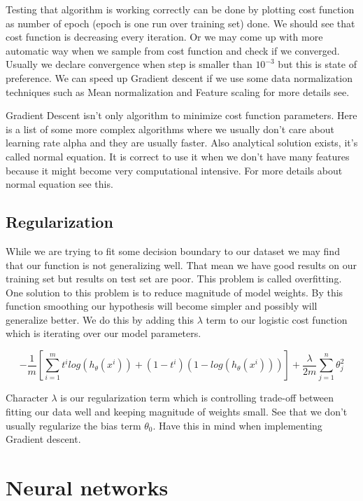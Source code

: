 Testing that algorithm is working correctly can be done by plotting cost function  as number of epoch (epoch is one run over training set) done. We should see that cost function is decreasing every iteration. Or we may come up with more automatic way when we sample from cost function and check if we converged. Usually we declare convergence when step is smaller than \(10^{-3}\) but this is state of preference.  We can speed up Gradient descent if we use some data normalization techniques such as Mean normalization and Feature scaling for more details see. 

Gradient Descent isn't only algorithm to minimize cost function parameters. Here is a list of some more complex algorithms where we usually don't care about learning rate alpha and they are usually faster. Also analytical solution exists, it's called normal equation. It is correct to use it when we don't have many features because it might become very computational intensive. For more details about normal equation see this.

\section{Regularization}
While we are trying to fit some decision boundary to our dataset we may find that our function is not generalizing well. That mean we have good results on our training set but results on test set are poor. This problem is called overfitting. One solution to this problem is to reduce magnitude of model weights. By this function smoothing our hypothesis will become simpler and possibly will generalize better. We do this by adding this \(\lambda\) term to our logistic cost function which is iterating over our model parameters.

\begin{equation}
-\frac{1}{m}[\sum\limits_{i=1}^m t^i log(h_\theta(x^i)) + (1-t^i) (1 - log(h_\theta(x^i)))] + \frac{\lambda}{2m}\sum\limits_{j=1}^n \theta_j^2 
\end{equation}

Character \(\lambda\) is our regularization term which is controlling trade-off between fitting our data well and keeping magnitude of weights small. See that we don't usually regularize the bias term \(\theta_0\). Have this in mind when implementing Gradient descent.

\chapter{Neural networks}

